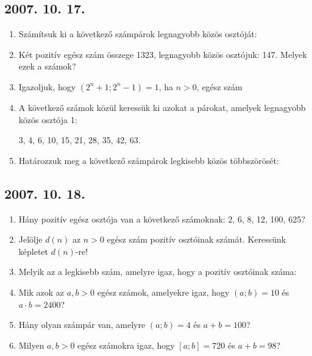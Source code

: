 \subsection*{2007. 10. 17.}
\begin{enumerate}
\item Számítsuk ki a következő számpárok legnagyobb közös osztóját:
\item Két pozitív egész szám összege 1323, legnagyobb közös osztójuk: 147. Melyek ezek a számok?
\item Igazoljuk, hogy $(2^n+1;2^n-1)=1$, ha $n>0$, egész szám
\item A következő számok közül keressük ki azokat a párokat, amelyek legnagyobb közös osztója 1:

3, 4, 6, 10, 15, 21, 28, 35, 42, 63.
\item Határozzuk meg a következő számpárok legkisebb közös többszörösét:
\end{enumerate}


\subsection*{2007. 10. 18.}
\begin{enumerate}
\item Hány pozitív egész osztója van a következő számoknak: 2, 6, 8, 12, 100, 625?
\item Jelölje $d(n)$ az $n>0$ egész szám pozitív osztóinak számát. Keressünk képletet $d(n)$-re!
\item Melyik az a legkisebb szám, amelyre igaz, hogy a pozitív osztóinak száma: 
\item Mik azok az $a,b>0$ egész számok, amelyekre igaz, hogy $(a;b)=10$ és $a\cdot b=2400$?
\item Hány olyan számpár van, amelyre $(a;b)=4$ és $a+b=100$?
\item Milyen $a,b>0$ egész számokra igaz, hogy $[a;b]=720$ és $a+b=98$?
\end{enumerate}


